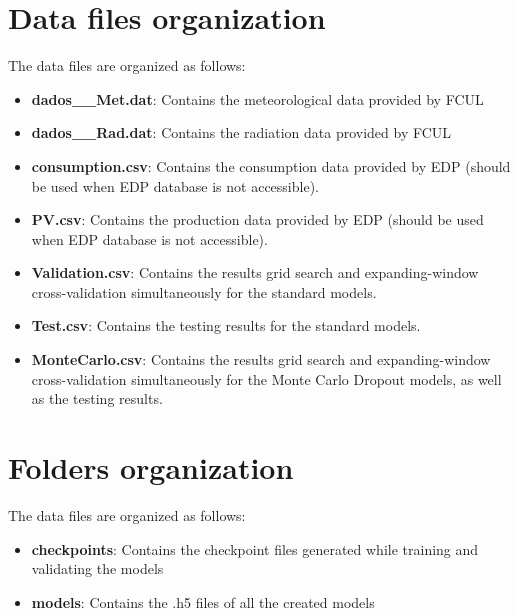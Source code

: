 \section{Data files organization}
The data files are organized as follows:
\begin{itemize}
    \item \textbf{dados\_\_Met.dat}: Contains the meteorological data provided by \ac{FCUL}
    \item \textbf{dados\_\_Rad.dat}: Contains the radiation data provided by \ac{FCUL}
    \item \textbf{consumption.csv}: Contains the consumption data provided by \ac{EDP} (should be used when \ac{EDP} database is not accessible). 
    \item \textbf{PV.csv}: Contains the production data provided by \ac{EDP} (should be used when \ac{EDP} database is not accessible). 
    \item \textbf{Validation.csv}: Contains the results grid search and expanding-window cross-validation simultaneously for the standard models.
    \item \textbf{Test.csv}: Contains the testing results for the standard models.
    \item \textbf{MonteCarlo.csv}: Contains the results grid search and expanding-window cross-validation simultaneously for the Monte Carlo Dropout models, as well as the testing results.
\end{itemize}

\section{Folders organization}
The data files are organized as follows:
\begin{itemize}
    \item \textbf{checkpoints}: Contains the checkpoint files generated while training and validating the models
    \item \textbf{models}: Contains the .h5 files of all the created models
\end{itemize}